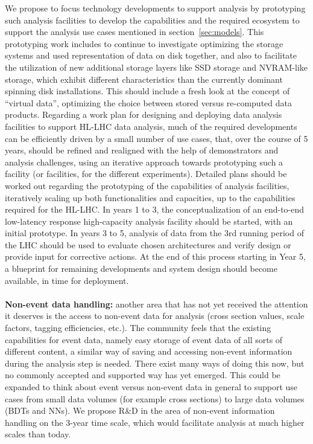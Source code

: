 \documentclass[12pt,a4paper]{article}
\begin{document}
We propose to focus technology developments to support analysis by prototyping such analysis facilities to develop the capabilities and the required ecosystem to support the analysis use cases mentioned in section~\ref{sec:models}. This prototyping work  includes to continue to investigate optimizing the storage systems and used representation of data on disk together, and also to facilitate the utilization of new additional storage layers like SSD storage and NVRAM-like storage, which exhibit different characteristics than the currently dominant spinning disk installations. This should include a fresh look at the concept of ``virtual data'', optimizing the choice between stored versus re-computed data products. Regarding a work plan for designing and deploying data analysis facilities to support HL-LHC data analysis, much of the required developments can be efficiently driven by a small number of use cases, that, over the course of 5 years, should be refined and realigned with the help of demonstrators and analysis challenges, using an iterative approach towards prototyping such a facility (or facilities, for the different experiments). Detailed plans should be worked out regarding the prototyping of the capabilities of analysis facilities, iteratively scaling up both functionalities and capacities, up to the capabilities required for the HL-LHC. In years 1 to 3, the conceptualization of an end-to-end low-latency response high-capacity analysis facility should be started, with an initial prototype. In years 3 to 5, analysis of data from the 3rd running period of the LHC should be used to evaluate chosen architectures and verify design or provide input for corrective actions. At the end of this process starting in Year 5, a blueprint for remaining developments and system design should become available, in time for deployment.\\ \\
{\bf Non-event data handling:} another area that has not yet received the attention it deserves is the access to non-event data for analysis (cross section values, scale factors, tagging efficiencies, etc.). The community feels that the existing capabilities for event data, namely easy storage of event data of all sorts of different content, a similar way of saving and accessing non-event information during the analysis step is needed. There exist many ways of doing this now, but no commonly accepted and supported way has yet emerged. This could be expanded to think about event versus non-event data in general to support use cases from small data volumes (for example cross sections) to large data volumes (BDTs and NNs). We propose R\&D in the area of non-event information handling on the 3-year time scale, which would facilitate analysis at much higher scales than today.
\end{document}
